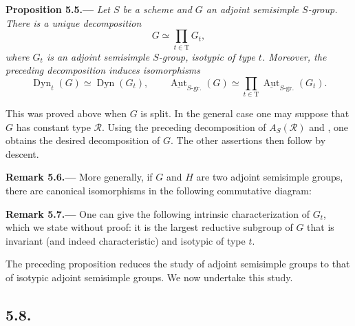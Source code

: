 
\par\medskip\noindent{}\textbf{Proposition 5.5.---}\enspace
\emph{Let \(S\) be a scheme and \(G\) an adjoint semisimple
\(S\)-group.  There is a unique decomposition}
\[
  G\simeq\prod_{t\in\mathrm T}G_t,
\]
\emph{where \(G_t\) is an adjoint semisimple \(S\)-group, isotypic of
type \(t\).  Moreover, the preceding decomposition induces
isomorphisms}
\[
  \operatorname{Dyn}_t(G)\simeq\operatorname{Dyn}(G_t),
  \qquad
  \underline{\operatorname{Aut}}_{S\text{-}\mathrm{gr.}}(G)
  \simeq
  \prod_{t\in\mathrm T}
  \underline{\operatorname{Aut}}_{S\text{-}\mathrm{gr.}}(G_t).
\]

This was proved above when \(G\) is split.  In the general case one may
suppose that \(G\) has constant type \(\mathscr R\).  Using the
preceding decomposition of \(A_S(\mathscr R)\) and , one obtains
the desired decomposition of \(G\).  The other assertions then follow
by descent.

\par\medskip\noindent{}\textbf{Remark 5.6.---}\enspace
More generally, if \(G\) and \(H\) are two adjoint semisimple groups,
there are canonical isomorphisms in the following commutative diagram:
\[
  
\]

\par\medskip\noindent{}\textbf{Remark 5.7.---}\enspace
One can give the following intrinsic characterization of \(G_t\),
which we state without proof: it is the largest reductive subgroup of
\(G\) that is invariant (and indeed characteristic) and isotypic of
type \(t\).

The preceding proposition reduces the study of adjoint semisimple
groups to that of isotypic adjoint semisimple groups.  We now undertake
this study.

\subsection*{5.8.}

